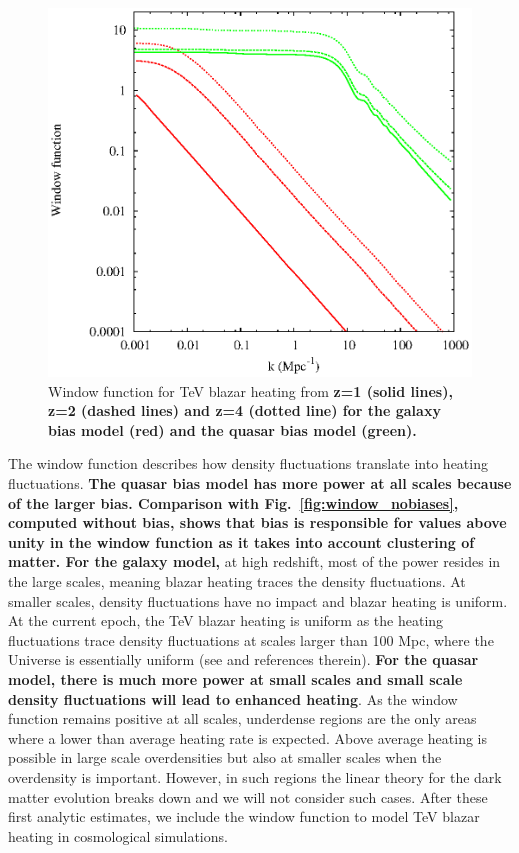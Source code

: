 \documentclass[twocolumns]{emulateapj}
\newcommand\ALc[1]{{\color{red} \bf #1}} %
\begin{document}
\begin{figure}[h]
  \centering
  \includegraphics[width = .45\textwidth ]{window_gal_qso}
  \caption{Window function for TeV blazar heating from \ALc{z=1 (solid lines), z=2 (dashed lines) and z=4 (dotted line) for the galaxy bias model (red) and the quasar bias model (green).}}
  \label{fig:window}
\end{figure}

The window function describes how density fluctuations translate into heating fluctuations. \ALc{The quasar  bias model has more power at all scales because of the larger bias. Comparison with Fig.~\ref{fig:window_nobiases}, computed without bias, shows that bias is responsible for values above unity in the window function as it takes into account clustering of matter. For the galaxy model,} at high redshift, most of the power resides in the large scales, meaning blazar heating traces the density fluctuations. At smaller scales, density fluctuations have no impact and blazar heating is uniform. At the current epoch,  the TeV blazar heating is uniform as the heating fluctuations trace density fluctuations at scales larger than 100 Mpc, where the Universe is essentially uniform  (see \citet{2013MNRAS.429.2910C} and references therein). \ALc{For the quasar model, there is much more power at small scales and small scale density fluctuations will lead to enhanced heating}. As the window function remains positive at all scales, underdense regions are the only areas where a lower than average heating rate is expected. Above average  heating is possible in large scale overdensities but also at  smaller scales when the overdensity is important.  However, in such regions the linear theory for the dark matter evolution breaks down and we will not consider such cases. After these first analytic estimates, we include the window function to model TeV blazar heating in cosmological simulations. 



\end{document}
